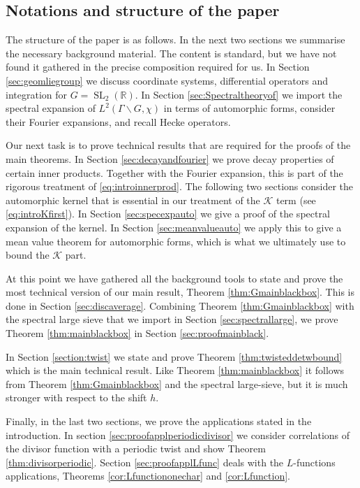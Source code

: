 \documentclass[12pt]{amsart}
\theoremstyle{definition}
\theoremstyle{remark}
\numberwithin{equation}{section}
\newcommand{\R}{{\mathbb R}}
\newcommand{\1}{{\mathbf 1}}
\newcommand{\SL}{\operatorname{SL}_2}
\begin{document}
\subsection{Notations and structure of the paper}


The structure of the paper is as follows. In the next two sections we summarise the necessary background material. The content is standard, but we have not found it gathered in the precise composition required for us. In Section \ref{sec:geomliegroup} we discuss coordinate systems, differential operators and integration for $G=\SL(\R)$. In Section \ref{sec:Spectraltheoryof} we import the spectral expansion of $L^2(\Gamma\backslash G,\chi)$ in terms of automorphic forms, consider their Fourier expansions, and recall Hecke operators. 

Our next task is to prove technical results that are required for the proofs of the main theorems. In Section \ref{sec:decayandfourier} we prove decay properties of certain inner products. Together with the Fourier expansion, this is part of the rigorous treatment of \eqref{eq:introinnerprod}. The following two sections consider the automorphic kernel that is essential in our treatment of the $\mathcal{K}$ term (see  \eqref{eq:introKfirst}). In Section \ref{sec:specexpauto} we give a proof of the spectral expansion of the kernel. In Section \ref{sec:meanvalueauto} we apply this to give a mean value theorem for automorphic forms, which is what we ultimately use to bound the $\mathcal{K}$ part.

At this point we have gathered all the background tools to state and prove the most technical version of our main result, Theorem \ref{thm:Gmainblackbox}. This is done in Section \ref{sec:discaverage}. Combining Theorem \ref{thm:Gmainblackbox} with the spectral large sieve that we import in Section \ref{sec:spectrallarge}, we prove Theorem \ref{thm:mainblackbox} in Section \ref{sec:proofmainblack}.

In Section \ref{section:twist} we state and prove Theorem \ref{thm:twisteddetwbound} which is the main technical result. Like Theorem \ref{thm:mainblackbox} it follows from Theorem \ref{thm:Gmainblackbox} and the spectral large-sieve, but it is much stronger with respect to the shift $h$.  

Finally, in the last two sections, we prove the applications stated in the introduction. In section \ref{sec:proofapplperiodicdivisor} we consider correlations of the divisor function with a periodic twist and show Theorem \ref{thm:divisorperiodic}. Section \ref{sec:proofapplLfunc} deals with the $L$-functions applications, Theorems \ref{cor:Lfunctiononechar} and \ref{cor:Lfunction}. 
\end{document}

